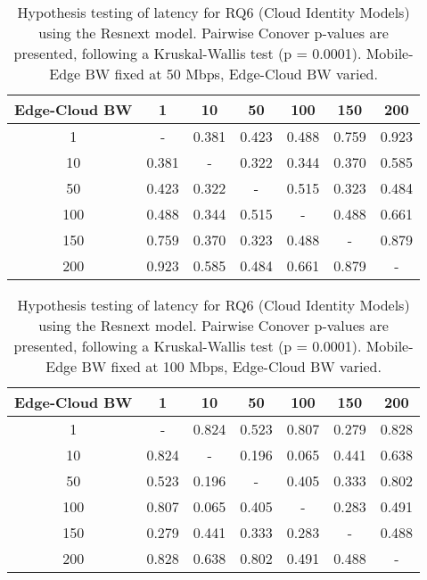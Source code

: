 \begin{table}[H]
\caption{Hypothesis testing of latency for RQ6 (Cloud Identity Models) using the Resnext model. Pairwise Conover p-values are presented, following a Kruskal-Wallis test (p = 0.0001). Mobile-Edge BW fixed at 50 Mbps, Edge-Cloud BW varied.}
\centering
\begin{tabular}{c|cccccc}
Edge-Cloud BW & 1 & 10 & 50 & 100 & 150 & 200 \\
\hline
1 & - & 0.381 & 0.423 & 0.488 & 0.759 & 0.923 \\
10 & 0.381 & - & 0.322 & 0.344 & 0.370 & 0.585 \\
50 & 0.423 & 0.322 & - & 0.515 & 0.323 & 0.484 \\
100 & 0.488 & 0.344 & 0.515 & - & 0.488 & 0.661 \\
150 & 0.759 & 0.370 & 0.323 & 0.488 & - & 0.879 \\
200 & 0.923 & 0.585 & 0.484 & 0.661 & 0.879 & - \\
\end{tabular}
\end{table}

\begin{table}[H]
\caption{Hypothesis testing of latency for RQ6 (Cloud Identity Models) using the Resnext model. Pairwise Conover p-values are presented, following a Kruskal-Wallis test (p = 0.0001). Mobile-Edge BW fixed at 100 Mbps, Edge-Cloud BW varied.}
\centering
\begin{tabular}{c|cccccc}
Edge-Cloud BW & 1 & 10 & 50 & 100 & 150 & 200 \\
\hline
1 & - & 0.824 & 0.523 & 0.807 & 0.279 & 0.828 \\
10 & 0.824 & - & 0.196 & 0.065 & 0.441 & 0.638 \\
50 & 0.523 & 0.196 & - & 0.405 & 0.333 & 0.802 \\
100 & 0.807 & 0.065 & 0.405 & - & 0.283 & 0.491 \\
150 & 0.279 & 0.441 & 0.333 & 0.283 & - & 0.488 \\
200 & 0.828 & 0.638 & 0.802 & 0.491 & 0.488 & - \\
\end{tabular}
\end{table}

